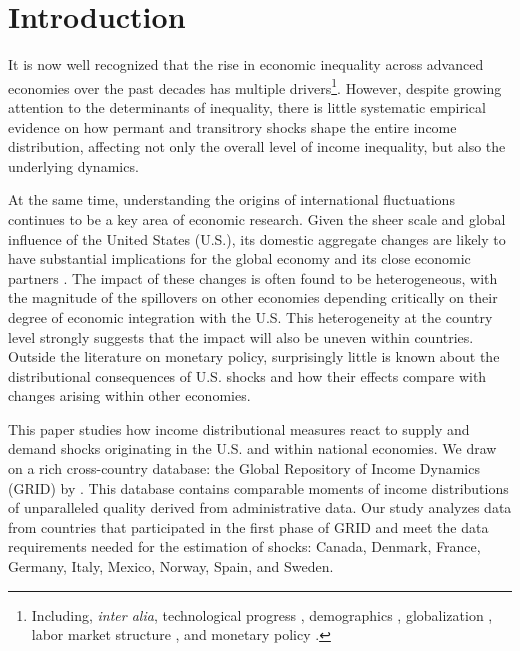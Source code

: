 \documentclass[12pt, a4paper]{article}
\begin{document}
\section{Introduction}
It is now well recognized that the rise in economic inequality across advanced economies over the past decades has multiple drivers\footnote{Including, \emph{inter alia}, technological progress \parencite{Bound1995, Acemoglu2002}, demographics \parencite{Karahan2013}, globalization \parencite{feenstra2003global}, labor market structure \parencite{jaumotte2015inequality}, and monetary policy \parencite{coibion2017innocent, furceri2018effects, Amberg2022, andersen2023monetary}.}. However, despite growing attention to the determinants of inequality, there is little systematic empirical evidence on how permant and transitrory shocks shape the entire income distribution, affecting not only the overall level of income inequality, but also the underlying dynamics.

At the same time, understanding the origins of international fluctuations continues to be a key area of economic research. Given the sheer scale and global influence of the United States (U.S.), its domestic aggregate changes are likely to have substantial implications for the global economy and its close economic partners \parencite{Kose2003, canova2005transmission, Kose2012, kose2017global, kalemli2013global, Fink2015, rey2016, ramey2016macroeconomic, miranda2022global, carrillo2020inquiry, levchenko2020tfp, lakdawala2021international, dees2021global, di2022international, lastauskas2023global}. The impact of these changes is often found to be heterogeneous, with the magnitude of the spillovers on other economies depending critically on their degree of economic integration with the U.S. This heterogeneity at the country level strongly suggests that the impact will also be uneven within countries. Outside the literature on monetary policy, surprisingly little is known about the distributional consequences of U.S. shocks and how their effects compare with changes arising within other economies.

This paper studies how income distributional measures react to supply and demand shocks originating in the U.S. and within national economies. We draw on a rich cross-country database: the Global Repository of Income Dynamics (GRID) by \textcite{guvenen2022global}. This database contains comparable moments of income distributions of unparalleled quality derived from administrative data. Our study analyzes data from countries that participated in the first phase of GRID and meet the data requirements needed for the estimation of shocks: Canada, Denmark, France, Germany, Italy, Mexico, Norway, Spain, and Sweden.
\end{document}
